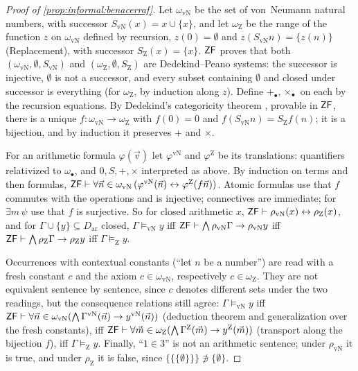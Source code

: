 \begin{proof}[Proof of \cref{prop:informal:benacerraf}]
Let $\omega_{\mathrm{vN}}$ be the set of von~Neumann natural numbers, with successor $S_{\mathrm{vN}}(x)=x\cup\{x\}$, and let $\omega_{\mathrm Z}$ be the range of the function $z$ on $\omega_{\mathrm{vN}}$ defined by recursion, $z(0)=\emptyset$ and $z(S_{\mathrm{vN}}n)=\{z(n)\}$ (Replacement), with successor $S_{\mathrm Z}(x)=\{x\}$. $\mathsf{ZF}$ proves that both $(\omega_{\mathrm{vN}},\emptyset,S_{\mathrm{vN}})$ and $(\omega_{\mathrm Z},\emptyset,S_{\mathrm Z})$ are Dedekind--Peano systems: the successor is injective, $\emptyset$ is not a successor, and every subset containing $\emptyset$ and closed under successor is everything (for $\omega_{\mathrm Z}$, by induction along $z$). Define $+_\bullet,\times_\bullet$ on each by the recursion equations. By Dedekind's categoricity theorem \citep{dedekind1888zahlen}, provable in $\mathsf{ZF}$, there is a unique $f:\omega_{\mathrm{vN}}\to\omega_{\mathrm Z}$ with $f(0)=0$ and $f(S_{\mathrm{vN}}n)=S_{\mathrm Z}f(n)$; it is a bijection, and by induction it preserves $+$ and $\times$.

For an arithmetic formula $\varphi(\vec v)$ let $\varphi^{\mathrm{vN}}$ and $\varphi^{\mathrm Z}$ be its translations: quantifiers relativized to $\omega_\bullet$, and $0,S,+,\times$ interpreted as above. By induction on terms and then formulas, $\mathsf{ZF}\vdash\forall\vec n\in\omega_{\mathrm{vN}}\,(\varphi^{\mathrm{vN}}(\vec n)\leftrightarrow\varphi^{\mathrm Z}(f\vec n))$. Atomic formulas use that $f$ commutes with the operations and is injective; connectives are immediate; for $\exists m\,\psi$ use that $f$ is surjective. So for closed arithmetic $x$, $\mathsf{ZF}\vdash\rho_{\mathrm{vN}}(x)\leftrightarrow\rho_{\mathrm Z}(x)$, and for $\Gamma\cup\{y\}\subseteq D_{\mathrm{ar}}$ closed, $\Gamma\models_{\mathrm{vN}}y$ iff $\mathsf{ZF}\vdash\bigwedge\rho_{\mathrm{vN}}\Gamma\to\rho_{\mathrm{vN}}y$ iff $\mathsf{ZF}\vdash\bigwedge\rho_{\mathrm Z}\Gamma\to\rho_{\mathrm Z}y$ iff $\Gamma\models_{\mathrm Z}y$.

Occurrences with contextual constants (``let $n$ be a number'') are read with a fresh constant $c$ and the axiom $c\in\omega_{\mathrm{vN}}$, respectively $c\in\omega_{\mathrm Z}$. They are not equivalent sentence by sentence, since $c$ denotes different sets under the two readings, but the consequence relations still agree: $\Gamma\models_{\mathrm{vN}}y$ iff $\mathsf{ZF}\vdash\forall\vec n\in\omega_{\mathrm{vN}}(\bigwedge\Gamma^{\mathrm{vN}}(\vec n)\to y^{\mathrm{vN}}(\vec n))$ (deduction theorem and generalization over the fresh constants), iff $\mathsf{ZF}\vdash\forall\vec m\in\omega_{\mathrm Z}(\bigwedge\Gamma^{\mathrm Z}(\vec m)\to y^{\mathrm Z}(\vec m))$ (transport along the bijection $f$), iff $\Gamma\models_{\mathrm Z}y$. Finally, ``$1\in3$'' is not an arithmetic sentence; under $\rho_{\mathrm{vN}}$ it is true, and under $\rho_{\mathrm Z}$ it is false, since $\{\{\{\emptyset\}\}\}\not\ni\{\emptyset\}$.
\end{proof}

